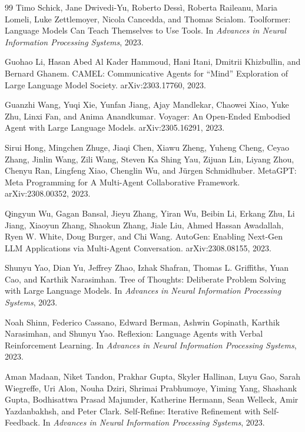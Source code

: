 \documentclass{article}
\begin{document}
\begin{thebibliography}{99}
Timo Schick, Jane Dwivedi-Yu, Roberto Dess\`i, Roberta Raileanu, Maria Lomeli, Luke Zettlemoyer, Nicola Cancedda, and Thomas Scialom.
\newblock Toolformer: Language Models Can Teach Themselves to Use Tools.
\newblock In \emph{Advances in Neural Information Processing Systems}, 2023.

Guohao Li, Hasan Abed Al Kader Hammoud, Hani Itani, Dmitrii Khizbullin, and Bernard Ghanem.
\newblock CAMEL: Communicative Agents for ``Mind'' Exploration of Large Language Model Society.
\newblock arXiv:2303.17760, 2023.

Guanzhi Wang, Yuqi Xie, Yunfan Jiang, Ajay Mandlekar, Chaowei Xiao, Yuke Zhu, Linxi Fan, and Anima Anandkumar.
\newblock Voyager: An Open-Ended Embodied Agent with Large Language Models.
\newblock arXiv:2305.16291, 2023.

Sirui Hong, Mingchen Zhuge, Jiaqi Chen, Xiawu Zheng, Yuheng Cheng, Ceyao Zhang, Jinlin Wang, Zili Wang, Steven Ka Shing Yau, Zijuan Lin, Liyang Zhou, Chenyu Ran, Lingfeng Xiao, Chenglin Wu, and J\"urgen Schmidhuber.
\newblock MetaGPT: Meta Programming for A Multi-Agent Collaborative Framework.
\newblock arXiv:2308.00352, 2023.

Qingyun Wu, Gagan Bansal, Jieyu Zhang, Yiran Wu, Beibin Li, Erkang Zhu, Li Jiang, Xiaoyun Zhang, Shaokun Zhang, Jiale Liu, Ahmed Hassan Awadallah, Ryen W. White, Doug Burger, and Chi Wang.
\newblock AutoGen: Enabling Next-Gen LLM Applications via Multi-Agent Conversation.
\newblock arXiv:2308.08155, 2023.

Shunyu Yao, Dian Yu, Jeffrey Zhao, Izhak Shafran, Thomas L. Griffiths, Yuan Cao, and Karthik Narasimhan.
\newblock Tree of Thoughts: Deliberate Problem Solving with Large Language Models.
\newblock In \emph{Advances in Neural Information Processing Systems}, 2023.

Noah Shinn, Federico Cassano, Edward Berman, Ashwin Gopinath, Karthik Narasimhan, and Shunyu Yao.
\newblock Reflexion: Language Agents with Verbal Reinforcement Learning.
\newblock In \emph{Advances in Neural Information Processing Systems}, 2023.

Aman Madaan, Niket Tandon, Prakhar Gupta, Skyler Hallinan, Luyu Gao, Sarah Wiegreffe, Uri Alon, Nouha Dziri, Shrimai Prabhumoye, Yiming Yang, Shashank Gupta, Bodhisattwa Prasad Majumder, Katherine Hermann, Sean Welleck, Amir Yazdanbakhsh, and Peter Clark.
\newblock Self-Refine: Iterative Refinement with Self-Feedback.
\newblock In \emph{Advances in Neural Information Processing Systems}, 2023.


\end{thebibliography}
\end{document}

